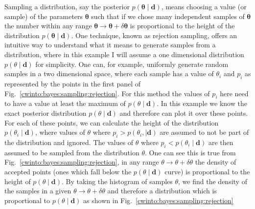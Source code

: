 Sampling a distribution, say the posterior $p(\bm{\theta} \mid \bm{d})$, means
choosing a value (or sample) of the parameters $\bm{\theta}$ such that if we
chose many independent samples of $\bm{\theta}$ the number within any range
$\bm{\theta} \rightarrow \bm{\theta} + \delta \bm{\theta}$ is proportional to
the height of the distribution $p(\bm{\theta} \mid \bm{d})$.  One technique,
known as rejection sampling, offers an intuitive way to understand what it
means to generate samples from a distribution, where in this example I will
assume a one dimensional distribution $p(\theta \mid \bm{d})$ for simplicity.
One can, for example, uniformly generate random samples in a two dimensional
space, where each sample has a value of $\theta_i$ and $p_i$
as represented by the points in
the first panel of Fig.~\ref{cwinto:bayes:sampling:rejection}. For this method the values of $p_i$ here need to have a value at least the maximum of $p(\theta \mid \bm{d})$. In this example
we know the exact posterior distribution $p(\theta \mid \bm{d})$ and therefore
can plot it over these points.  For each of these points, we can calculate the
height of the distribution $p(\theta_i \mid \bm{d})$, where values of $\theta$
where $p_i > p(\theta_i, \mid \bm{d})$ are assumed to not be part of the
distribution and ignored. The values of $\theta$ where $p_i < p(\theta_i \mid
\bm{d})$ are then assumed to be sampled from the distribution $\theta$.  One
can see this is true from Fig.~\ref{cwinto:bayes:sampling:rejection}, in any
range $\theta \rightarrow \theta + \delta \theta$ the density of accepted
points (ones which fall below the $p(\theta \mid \bm{d})$ curve) is
proportional to the height of $p(\theta \mid \bm{d})$.  By taking the histogram
of samples $\theta$, we find the density of the samples in a given $\theta
\rightarrow \theta + \delta \theta$ and therefore a distribution which is
proportional to $p(\theta \mid \bm{d})$ as shown in
Fig.~\ref{cwinto:bayes:sampling:rejection} 

